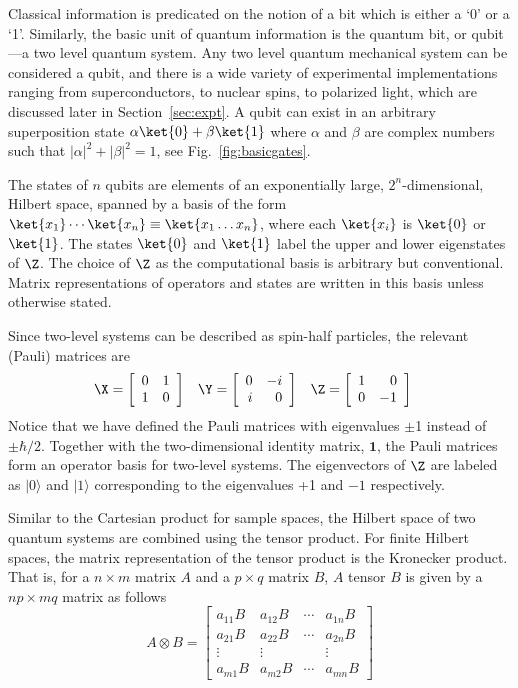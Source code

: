 \documentclass[11pt,oneside,final]{huthesis}%
\begin{document}
Classical information is predicated on the notion of a bit which is either a `0' or a `1'.  Similarly, the basic unit of quantum information is the quantum bit, or qubit---a two level quantum system.
Any two level quantum mechanical system can be considered a qubit, and there is a wide variety of experimental implementations ranging from superconductors, to nuclear spins, to polarized light, which are discussed later in Section~\ref{sec:expt}. A qubit can exist in an arbitrary superposition state $\alpha\ket{0}+\beta\ket{1}$ where  $\alpha$ and $\beta$ are complex numbers such that $|\alpha|^2+|\beta|^2=1$, see Fig.~\ref{fig:basicgates}.

The states of $n$ qubits are elements of an exponentially large, $2^n$-dimensional, Hilbert
space, spanned by a basis of the form
$\ket{x_1}\cdots\ket{x_n}\equiv\ket{x_1\ldots x_n}$, where each $\ket{x_i}$ is
$\ket{0}$ or $\ket{1}$.  The states $\ket{0}$ and $\ket{1}$ label the upper and lower eigenstates of $\Z$. The choice of $\Z$ as the computational basis is arbitrary but conventional.  Matrix representations of operators and states are written in this basis unless otherwise stated. 


Since two-level systems can be described as spin-half particles, the relevant (Pauli) matrices are
\begin{align*}
	&\X=\left[ \begin{array}{rr}
		0&1\\1&0
	\end{array}\right]& &\Y=\left[ \begin{array}{rr}
		0&-i\\i&0
	\end{array}\right]& &\Z=\left[ \begin{array}{rr}
		1&0\\0&-1
	\end{array}\right]
\end{align*}
{Notice that we have defined the Pauli matrices with eigenvalues $\pm$1 instead of $\pm \hbar/2$.}
Together with the two-dimensional identity matrix, $\mathbf{1}$, the Pauli matrices form an operator basis for two-level systems.
{The eigenvectors of $\Z$ are labeled as $|0\rangle$ and $|1\rangle$ corresponding to the eigenvalues}
{+1 and $-1$ respectively.}

Similar to the Cartesian product for sample spaces, the Hilbert space of two quantum systems are combined using the tensor product.  For finite Hilbert spaces, the matrix representation of the tensor product is the Kronecker product.  That is, for a $n\times m$ matrix $A$ and a $p\times q$ matrix $B$, $A$ tensor $B$ is given by a $np\times mq$ matrix as follows
\[A\otimes B=\left[ \begin{array}{llll}
	a_{11}B&a_{12}B&\cdots&a_{1n}B\\
	a_{21}B&a_{22}B&\cdots&a_{2n}B\\
	\vdots&\vdots&      &\vdots\\
	a_{m1}B&a_{m2}B&\cdots&a_{mn}B
\end{array}\right]\]
\end{document}
